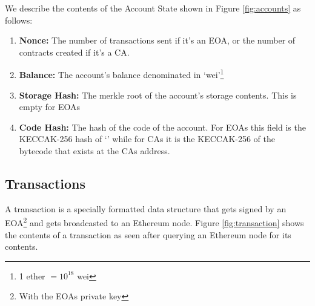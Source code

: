 We describe the contents of the Account State shown in Figure \ref{fig:accounts} as follows:
\begin{enumerate}
    \item \textbf{Nonce:} The number of transactions sent if it's an EOA, or the number of contracts created if it's a CA.
    \item \textbf{Balance:} The account's balance denominated in `wei'\footnote{1 ether $= 10^{18}$ wei }
    \item \textbf{Storage Hash:} The merkle root of the account's storage contents. This is empty for EOAs
    \item \textbf{Code Hash:} The hash of the code of the account. For EOAs this field is the KECCAK-256 hash of `' while for CAs it is the KECCAK-256 of the bytecode that exists at the CAs address.
\end{enumerate}

\subsection{Transactions} \label{transactions}
A transaction is a specially formatted data structure that gets signed by an EOA\footnote{With the EOAs private key} and gets broadcasted to an Ethereum node. Figure \ref{fig:transaction} shows the contents of a transaction as seen after querying an Ethereum node for its contents.


